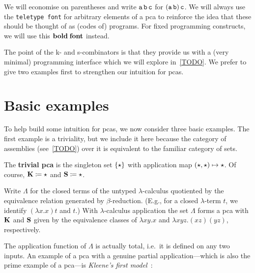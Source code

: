 \begin{notation}
  We will economise on parentheses and write \(\operatorname{\mathtt{a}}\operatorname{\mathtt{b}}\operatorname{\mathtt{c}}\) for
  \((\operatorname{\mathtt{a}}\operatorname{\mathtt{b}})\operatorname{\mathtt{c}}\).
  We will always use the \texttt{teletype font} for arbitrary elements of a pca
  to reinforce the idea that these should be thought of as (codes of) programs.
  For fixed programming constructs, we will use this \(\operatorname{\mathbf{bold\; font}}\)
  instead.
\end{notation}

The point of the k- and s-combinators is that they provide us with a (very
minimal) programming interface which we will explore in~\cref{TODO}.
%
We prefer to give two examples first to strengthen our intuition for pcas.

\section{Basic examples}

To help build some intuition for pcas, we now consider three basic examples. The
first example is a triviality, but we include it here because the category of
assemblies (see~\cref{TODO}) over it is equivalent to the familiar category of
sets.

\begin{example}
  The \textbf{trivial pca} is the singleton set \(\{\star\}\) with
  application map \((\star,\star) \mapsto \star\).
  Of course, \(\operatorname{\mathbf{K}} \coloneq \star\) and \(\operatorname{\mathbf{S}} \coloneq \star\).
\end{example}

\begin{example}
  Write \(\Lambda\) for the closed terms of the untyped \(\lambda\)-calculus
  quotiented by the equivalence relation generated by
  \(\beta\)-reduction. (E.g., for a closed \(\lambda\)-term \(t\), we identify
  \((\lambda{x}.{x})t\) and \(t\).)
  With \(\lambda\)-calculus application the set \(\Lambda\) forms a pca with
  \(\operatorname{\mathbf{K}}\) and \(\operatorname{\mathbf{S}}\) given by the equivalence classes of
  \(\lambda{xy}.x\) and \(\lambda{xyz}.(xz)(yz)\), respectively.
\end{example}

The application function of \(\Lambda\) is actually total, i.e.\ it is defined
on any two inputs. An example of a pca with a genuine partial application---which
is also the prime example of a pca---is \emph{Kleene's first model}~\cite{Kleene1945}:

